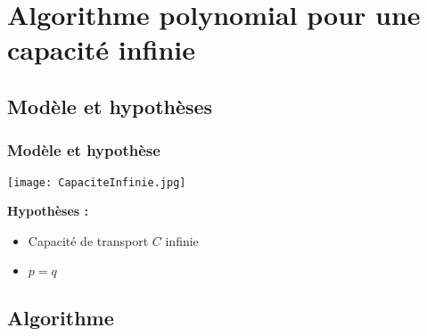\section{Algorithme polynomial pour une capacité infinie}

\subsection{Modèle et hypothèses}

\begin{frame}[label=CapaciteInfinie]
  \frametitle{Modèle et hypothèse}
  
  \begin{center}
  
    \begin{minipage}[c]{.5\linewidth}
      \begin{center}
        \texttt{[image: CapaciteInfinie.jpg]}
      \end{center}
    \end{minipage}\hfill
    \begin{minipage}[c]{.5\linewidth}
      \textbf{Hypothèses :}
      \begin{itemize}
      \item Capacité de transport $C$ infinie
      \item $p=q$
      \end{itemize}
    \end{minipage}
    
  \end{center}

\end{frame}

\subsection{Algorithme}

